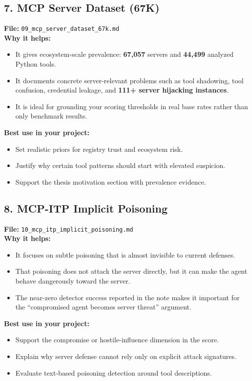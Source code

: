 \documentclass[11pt]{article}
\begin{document}
\subsection*{7. MCP Server Dataset (67K)}
\textbf{File:} \texttt{09\_mcp\_server\_dataset\_67k.md} \\
\textbf{Why it helps:}
\begin{itemize}[leftmargin=1.2em]
\item It gives ecosystem-scale prevalence: \textbf{67,057} servers and \textbf{44,499} analyzed Python tools.
\item It documents concrete server-relevant problems such as tool shadowing, tool confusion, credential leakage, and \textbf{111+ server hijacking instances}.
\item It is ideal for grounding your scoring thresholds in real base rates rather than only benchmark results.
\end{itemize}
\textbf{Best use in your project:}
\begin{itemize}[leftmargin=1.2em]
\item Set realistic priors for registry trust and ecosystem risk.
\item Justify why certain tool patterns should start with elevated suspicion.
\item Support the thesis motivation section with prevalence evidence.
\end{itemize}

\subsection*{8. MCP-ITP Implicit Poisoning}
\textbf{File:} \texttt{10\_mcp\_itp\_implicit\_poisoning.md} \\
\textbf{Why it helps:}
\begin{itemize}[leftmargin=1.2em]
\item It focuses on subtle poisoning that is almost invisible to current defenses.
\item That poisoning does not attack the server directly, but it can make the agent behave dangerously toward the server.
\item The near-zero detector success reported in the note makes it important for the ``compromised agent becomes server threat'' argument.
\end{itemize}
\textbf{Best use in your project:}
\begin{itemize}[leftmargin=1.2em]
\item Support the compromise or hostile-influence dimension in the score.
\item Explain why server defense cannot rely only on explicit attack signatures.
\item Evaluate text-based poisoning detection around tool descriptions.
\end{itemize}
\end{document}
